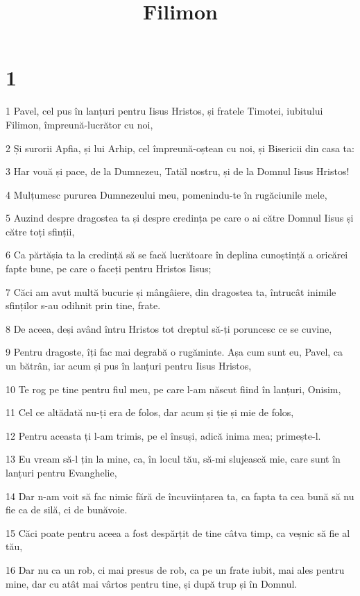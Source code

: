 

\title{Filimon}


\chapter{1}

\par 1 Pavel, cel pus în lanțuri pentru Iisus Hristos, și fratele Timotei, iubitului Filimon, împreună-lucrător cu noi,
\par 2 Și surorii Apfia, și lui Arhip, cel împreună-oștean cu noi, și Bisericii din casa ta:
\par 3 Har vouă și pace, de la Dumnezeu, Tatăl nostru, și de la Domnul Iisus Hristos!
\par 4 Mulțumesc pururea Dumnezeului meu, pomenindu-te în rugăciunile mele,
\par 5 Auzind despre dragostea ta și despre credința pe care o ai către Domnul Iisus și către toți sfinții,
\par 6 Ca părtășia ta la credință să se facă lucrătoare în deplina cunoștință a oricărei fapte bune, pe care o faceți pentru Hristos Iisus;
\par 7 Căci am avut multă bucurie și mângâiere, din dragostea ta, întrucât inimile sfinților s-au odihnit prin tine, frate.
\par 8 De aceea, deși având întru Hristos tot dreptul să-ți poruncesc ce se cuvine,
\par 9 Pentru dragoste, îți fac mai degrabă o rugăminte. Așa cum sunt eu, Pavel, ca un bătrân, iar acum și pus în lanțuri pentru Iisus Hristos,
\par 10 Te rog pe tine pentru fiul meu, pe care l-am născut fiind în lanțuri, Onisim,
\par 11 Cel ce altădată nu-ți era de folos, dar acum și ție și mie de folos,
\par 12 Pentru aceasta ți l-am trimis, pe el însuși, adică inima mea; primește-l.
\par 13 Eu vream să-l țin la mine, ca, în locul tău, să-mi slujească mie, care sunt în lanțuri pentru Evanghelie,
\par 14 Dar n-am voit să fac nimic fără de încuviințarea ta, ca fapta ta cea bună să nu fie ca de silă, ci de bunăvoie.
\par 15 Căci poate pentru aceea a fost despărțit de tine câtva timp, ca veșnic să fie al tău,
\par 16 Dar nu ca un rob, ci mai presus de rob, ca pe un frate iubit, mai ales pentru mine, dar cu atât mai vârtos pentru tine, și după trup și în Domnul.
